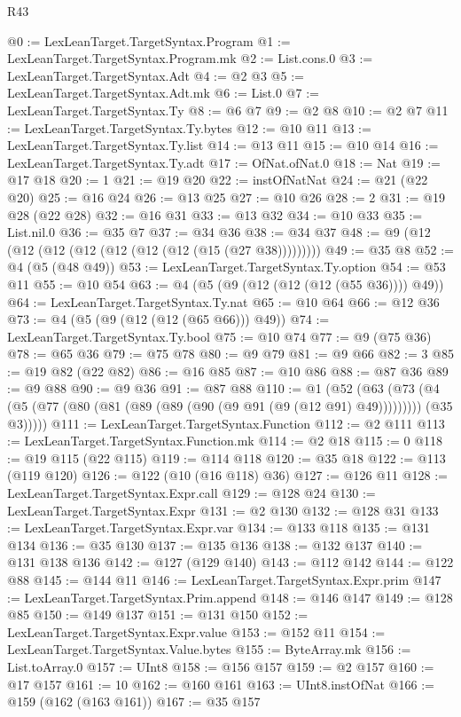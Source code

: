 \begin{lexlean}{R43}
\begin{coremodule}
@0 := LexLeanTarget.TargetSyntax.Program
@1 := LexLeanTarget.TargetSyntax.Program.mk
@2 := List.cons.{0}
@3 := LexLeanTarget.TargetSyntax.Adt
@4 := @2 @3
@5 := LexLeanTarget.TargetSyntax.Adt.mk
@6 := List.{0}
@7 := LexLeanTarget.TargetSyntax.Ty
@8 := @6 @7
@9 := @2 @8
@10 := @2 @7
@11 := LexLeanTarget.TargetSyntax.Ty.bytes
@12 := @10 @11
@13 := LexLeanTarget.TargetSyntax.Ty.list
@14 := @13 @11
@15 := @10 @14
@16 := LexLeanTarget.TargetSyntax.Ty.adt
@17 := OfNat.ofNat.{0}
@18 := Nat
@19 := @17 @18
@20 := 1
@21 := @19 @20
@22 := instOfNatNat
@24 := @21 (@22 @20)
@25 := @16 @24
@26 := @13 @25
@27 := @10 @26
@28 := 2
@31 := @19 @28 (@22 @28)
@32 := @16 @31
@33 := @13 @32
@34 := @10 @33
@35 := List.nil.{0}
@36 := @35 @7
@37 := @34 @36
@38 := @34 @37
@48 := @9 (@12 (@12 (@12 (@12 (@12 (@12 (@12 (@15 (@27 @38)))))))))
@49 := @35 @8
@52 := @4 (@5 (@48 @49))
@53 := LexLeanTarget.TargetSyntax.Ty.option
@54 := @53 @11
@55 := @10 @54
@63 := @4 (@5 (@9 (@12 (@12 (@12 (@55 @36)))) @49))
@64 := LexLeanTarget.TargetSyntax.Ty.nat
@65 := @10 @64
@66 := @12 @36
@73 := @4 (@5 (@9 (@12 (@12 (@65 @66))) @49))
@74 := LexLeanTarget.TargetSyntax.Ty.bool
@75 := @10 @74
@77 := @9 (@75 @36)
@78 := @65 @36
@79 := @75 @78
@80 := @9 @79
@81 := @9 @66
@82 := 3
@85 := @19 @82 (@22 @82)
@86 := @16 @85
@87 := @10 @86
@88 := @87 @36
@89 := @9 @88
@90 := @9 @36
@91 := @87 @88
@110 := @1
    (@52
      (@63
        (@73 (@4 (@5 (@77 (@80 (@81 (@89 (@89 (@90 (@9 @91 (@9 (@12 @91) @49))))))))) (@35 @3)))))
@111 := LexLeanTarget.TargetSyntax.Function
@112 := @2 @111
@113 := LexLeanTarget.TargetSyntax.Function.mk
@114 := @2 @18
@115 := 0
@118 := @19 @115 (@22 @115)
@119 := @114 @118
@120 := @35 @18
@122 := @113 (@119 @120)
@126 := @122 (@10 (@16 @118) @36)
@127 := @126 @11
@128 := LexLeanTarget.TargetSyntax.Expr.call
@129 := @128 @24
@130 := LexLeanTarget.TargetSyntax.Expr
@131 := @2 @130
@132 := @128 @31
@133 := LexLeanTarget.TargetSyntax.Expr.var
@134 := @133 @118
@135 := @131 @134
@136 := @35 @130
@137 := @135 @136
@138 := @132 @137
@140 := @131 @138 @136
@142 := @127 (@129 @140)
@143 := @112 @142
@144 := @122 @88
@145 := @144 @11
@146 := LexLeanTarget.TargetSyntax.Expr.prim
@147 := LexLeanTarget.TargetSyntax.Prim.append
@148 := @146 @147
@149 := @128 @85
@150 := @149 @137
@151 := @131 @150
@152 := LexLeanTarget.TargetSyntax.Expr.value
@153 := @152 @11
@154 := LexLeanTarget.TargetSyntax.Value.bytes
@155 := ByteArray.mk
@156 := List.toArray.{0}
@157 := UInt8
@158 := @156 @157
@159 := @2 @157
@160 := @17 @157
@161 := 10
@162 := @160 @161
@163 := UInt8.instOfNat
@166 := @159 (@162 (@163 @161))
@167 := @35 @157

\end{coremodule}
\end{lexlean}
